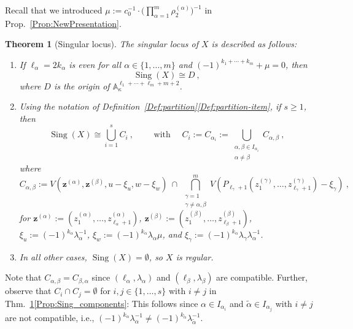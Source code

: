 \documentclass[letter,11pt]{amsart}
\renewcommand{\AA}{\ensuremath{\mathbb{A}}}
\DeclareMathOperator{\Sing}{Sing}
\newcommand{\z}{\boldsymbol{z}}
\newcommand{\XX}{X}
\theoremstyle{theorem}
\newtheorem{Thm}{Theorem}[section]         %
\theoremstyle{definition}
\newcommand{\len}{\ell}
\newcommand{\halflen}{k}
\numberwithin{equation}{section}
\begin{document}
Recall that we introduced $ \displaystyle  \mu := c_0^{-1} \cdot \Big( \prod_{\alpha=1}^m 
	\rho_{2}^{(\alpha)} \Big)^{-1} $ in Prop.~\ref{Prop:NewPresentation}.


\begin{Thm}[Singular locus]
	\label{Thm:Sing} 
	The singular locus of $ \XX $ is described as follows:
	\begin{enumerate}[(1)]
		\item\label{Prop:Sing_origin} 
		If $ \len_\alpha = 2 \halflen_\alpha $ is even for all $ \alpha \in \{ 1 , \ldots , m \} $
		and $ (-1)^{\halflen_1 + \cdots + \halflen_m} + \mu  = 0 $,
		then 
		\[
		\Sing ( \XX )  \cong D \ , 
		\] 
		where $ D $ is the origin of $ \AA_\kappa^{\len_1 + \cdots + \len_m+m+2} $.
		
		\item\label{Prop:Sing_components} 
		Using the notation of Definition~\ref{Def:partition}\eqref{Def:partition-item}, if $ s \geq 1 $, 
		then 
		\[  
			\Sing ( \XX ) \cong  \bigcup_{i=1}^s  C_i 
		\	,
		\qquad
		\mbox{ with } 
		\quad 
		C_i := C_{\alpha_i} := \bigcup_{\substack{\alpha,\beta \in I_{\alpha_i} \\ \alpha \neq \beta }} C_{\alpha,\beta}
		\ ,
		\]
		where 
		\[
		C_{\alpha,\beta}
		:=
		V (
		\z^{(\alpha)}, 
		\z^{(\beta)}, 
		u - \xi_u, 
		w - \xi_w 	) 	 
		\ \cap \
		\bigcap_{\substack{\gamma = 1 \\ \gamma \neq \alpha,\beta}}^m 
		V ( P_{\len_\gamma +1} ( z_1^{(\gamma)}, \ldots, z_{\len_\gamma + 1}^{(\gamma)} ) 
		- \xi_\gamma  )
		\ ,
		\]
		for 
		$ \z^{(\alpha)} := (z_1^{(\alpha)}, \ldots, z_{\len_\alpha +1}^{(\alpha)} ) $, $  \z^{(\beta)} := (z_1^{(\beta)}, \ldots, z_{\len_\beta +1}^{(\beta)} ) $, 
		$ \xi_u := (-1)^{\halflen_\alpha}  \lambda_\alpha^{-1} $,
		$ \xi_w := (-1)^{\halflen_\alpha}\lambda_\alpha\mu $,
		and $ \xi_\gamma := (-1)^{\halflen_\alpha} \lambda_\gamma \lambda_\alpha ^{-1}  $.		
		
		
		\item 
		In all other cases, $ \Sing(X) = \emptyset $, so $ X $ is regular.
	\end{enumerate}
\end{Thm}

Note that $ C_{\alpha,\beta} = C_{\beta,\alpha} $ since $(\ell_\alpha, \lambda_\alpha) $ and $(\ell_\beta, \lambda_\beta) $ are compatible. 
	Further,
observe that $ C_i \cap C_j = \emptyset $ for $ i,j \in \{ 1, \ldots, s \} $ with $ i \neq j $ in Thm.~\ref{Thm:Sing}\eqref{Prop:Sing_components}:
This follows since $ \alpha \in I_{\alpha_i} $ and $ \widetilde \alpha \in I_{\alpha_j} $ with $ i \neq j $ are not compatible, 
i.e.,
$ (-1)^{\halflen_\alpha}  \lambda_\alpha^{-1} \neq (-1)^{\halflen_{\widetilde \alpha}}  \lambda_{\widetilde \alpha}^{-1} $. 
\end{document}
